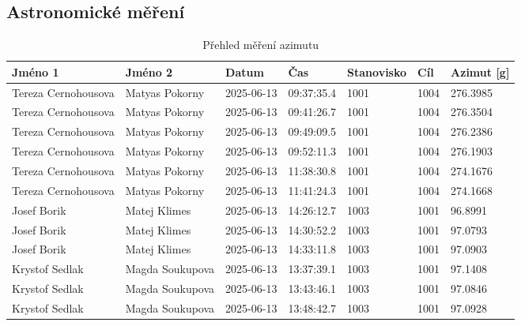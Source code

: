 \subsection{Astronomické měření}
\begin{table}[H]
\centering
\caption{Přehled měření azimutu}
\label{tab:vysledky_mereni}
\begin{tabular}{|l|l|l|l|l|l|l|}
\hline
\textbf{Jméno 1} & \textbf{Jméno 2} & \textbf{Datum} & \textbf{Čas} & \textbf{Stanovisko} & \textbf{Cíl} & \textbf{Azimut [g]} \\
\hline\hline
Tereza Cernohousova & Matyas Pokorny & 2025-06-13 & 09:37:35.4 & 1001 & 1004 & 276.3985 \\
\hline
Tereza Cernohousova & Matyas Pokorny & 2025-06-13 & 09:41:26.7 & 1001 & 1004 & 276.3504 \\
\hline
Tereza Cernohousova & Matyas Pokorny & 2025-06-13 & 09:49:09.5 & 1001 & 1004 & 276.2386 \\
\hline
Tereza Cernohousova & Matyas Pokorny & 2025-06-13 & 09:52:11.3 & 1001 & 1004 & 276.1903 \\
\hline
Tereza Cernohousova & Matyas Pokorny & 2025-06-13 & 11:38:30.8 & 1001 & 1004 & 274.1676 \\
\hline
Tereza Cernohousova & Matyas Pokorny & 2025-06-13 & 11:41:24.3 & 1001 & 1004 & 274.1668 \\
\hline
Josef Borik & Matej Klimes & 2025-06-13 & 14:26:12.7 & 1003 & 1001 &  96.8991 \\
\hline
Josef Borik & Matej Klimes & 2025-06-13 & 14:30:52.2 & 1003 & 1001 &  97.0793 \\
\hline
Josef Borik & Matej Klimes & 2025-06-13 & 14:33:11.8 & 1003 & 1001 &  97.0903 \\
\hline
Krystof Sedlak & Magda Soukupova & 2025-06-13 & 13:37:39.1 & 1003 & 1001 &  97.1408 \\
\hline
Krystof Sedlak & Magda Soukupova & 2025-06-13 & 13:43:46.1 & 1003 & 1001 &  97.0846 \\
\hline
Krystof Sedlak & Magda Soukupova & 2025-06-13 & 13:48:42.7 & 1003 & 1001 &  97.0928 \\
\hline
\end{tabular}
\end{table}

